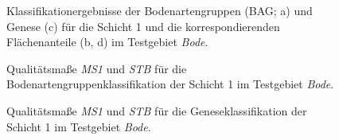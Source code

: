 \begin{figure}[p]
\quad
{}

\caption[Klassifikationergebnisse der  Bodenartengruppen und Genese für die Schicht 1 und die korrespondierenden Flächenanteile im Testgebiet \textit{Bode}.]{Klassifikationergebnisse der  Bodenartengruppen (BAG; a) und Genese (c) für die Schicht 1 und die korrespondierenden Flächenanteile (b, d) im Testgebiet \textit{Bode}.}\label{fig:class_final}
\end{figure}


\begin{figure}[p]
\quad
{}\quad
\caption{Qualitätsmaße \textit{MS1} und \textit{STB} für die Bodenartengruppenklassifikation der Schicht 1 im Testgebiet \textit{Bode}.}\label{fig:BAG-schicht1-qm}
\end{figure}

\begin{figure}[p]
\quad
{}
\caption{Qualitätsmaße \textit{MS1} und \textit{STB} für die Geneseklassifikation der Schicht 1 im Testgebiet \textit{Bode}.}\label{fig:GENESE-schicht1-qm}
\end{figure}

